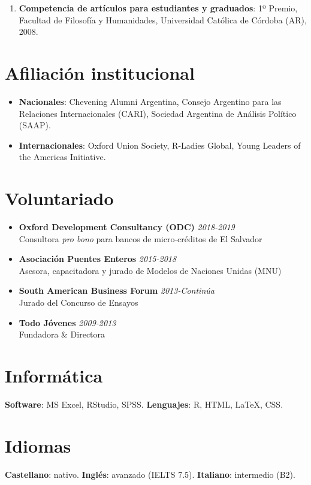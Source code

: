 \documentclass[12pt]{article}
\begin{document}
\begin{enumerate}
\item {\bf Competencia de artículos para estudiantes y graduados}: 1º Premio, Facultad de Filosofía y Humanidades, Universidad Católica de Córdoba (AR), 2008.

\end{enumerate}

\section*{Afiliación institucional}

\begin{itemize}

\item {\bf Nacionales}: Chevening Alumni Argentina, Consejo Argentino para las Relaciones Internacionales (CARI), Sociedad Argentina de Análisis Político (SAAP).

\item {\bf Internacionales}: Oxford Union Society, R-Ladies Global, Young Leaders of the Americas Initiative.

\end{itemize}

\section*{Voluntariado}

\begin{itemize}

\item {\bf Oxford Development Consultancy (ODC)} \hfill {\em 2018-2019} \\
Consultora {\it pro bono} para bancos de micro-créditos de El Salvador
    
\item {\bf Asociación Puentes Enteros} \hfill {\em 2015-2018} \\
Asesora, capacitadora y jurado de Modelos de Naciones Unidas (MNU)
    
\item {\bf South American Business Forum} \hfill {\em 2013-Continúa} \\
Jurado del Concurso de Ensayos
    
\item {\bf Todo Jóvenes} \hfill {\em 2009-2013} \\
Fundadora \& Directora
  
\end{itemize}
\section*{Informática}
\begin{rSection}
    {\bf Software}: MS Excel, RStudio, SPSS. {\bf Lenguajes}: R, HTML, \LaTeX, CSS.
    
\end{rSection}

\section*{Idiomas}
\begin{rSection}
    {\bf Castellano}: nativo. {\bf Inglés}: avanzado (IELTS 7.5). {\bf Italiano}: intermedio (B2).
    
\end{rSection}

\vfill

\date{Actualizado al \today}
\end{document}
